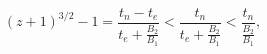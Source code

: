\begin{equation}
(z+1)^{3/2}-1=\frac{t_n-t_e}{t_e+\frac{B_2}{B_1}}<\frac{t_n}{t_e+\frac{B_2}{B_1}}<\frac{t_n}{\frac{B_2}{B_1}},
\end{equation}


